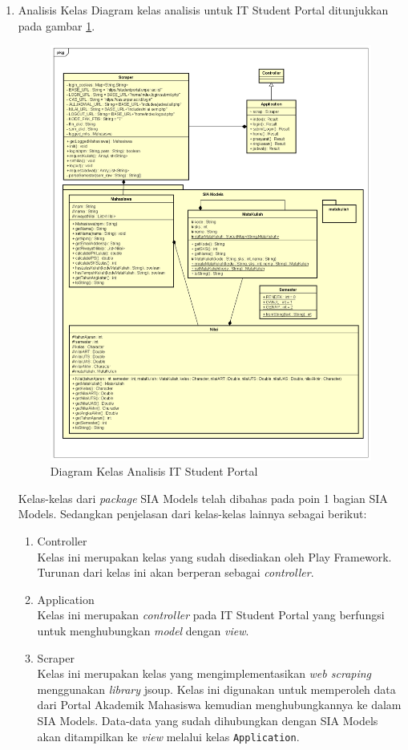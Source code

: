 \documentclass[a4paper,twoside]{article}
\begin{document}
\begin{enumerate}
\begin{enumerate}
\item{Analisis Kelas}
Diagram kelas analisis untuk IT Student Portal ditunjukkan pada gambar \ref{fig:3_class_diagram}.
	\begin{figure}[H]
			\centering
			\includegraphics[scale=0.5]{Gambar/class-diagram}
			\caption{Diagram Kelas Analisis IT Student Portal} 
			\label{fig:3_class_diagram}
		\end{figure}
Kelas-kelas dari \textit{package} SIA Models telah dibahas pada poin 1 bagian SIA Models. Sedangkan penjelasan dari kelas-kelas lainnya sebagai berikut:
\begin{enumerate}
	\item Controller\\
	Kelas ini merupakan kelas yang sudah disediakan oleh Play Framework. Turunan dari kelas ini akan berperan sebagai \textit{controller}.
	\item Application\\
	Kelas ini merupakan \textit{controller} pada IT Student Portal yang berfungsi untuk menghubungkan \textit{model} dengan \textit{view}. 
	\item Scraper\\
	Kelas ini merupakan kelas yang mengimplementasikan \textit{web scraping} menggunakan \textit{library} jsoup. Kelas ini digunakan untuk memperoleh data dari Portal Akademik Mahasiswa kemudian menghubungkannya ke dalam SIA Models. Data-data yang sudah dihubungkan dengan SIA Models akan ditampilkan ke \textit{view} melalui kelas \texttt{Application}.
\end{enumerate}
		


\end{enumerate}
\end{enumerate}
\end{document}
